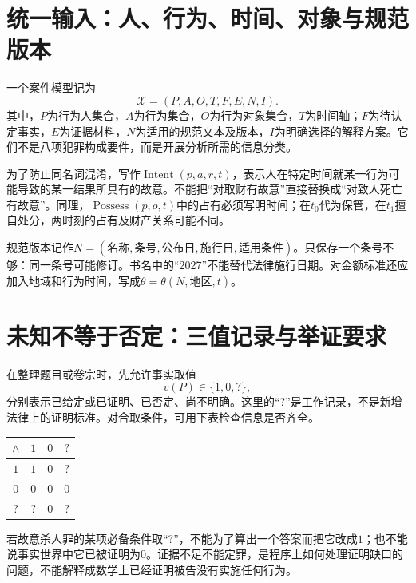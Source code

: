 \section{统一输入：人、行为、时间、对象与规范版本}
\begin{modeldef}[案件输入]
一个案件模型记为
\[
 \mathcal X=(P,A,O,T,F,E,N,I).
\]
其中，$P$为行为人集合，$A$为行为集合，$O$为行为对象集合，$T$为时间轴；$F$为待认定事实，$E$为证据材料，$N$为适用的规范文本及版本，$I$为明确选择的解释方案。它们不是八项犯罪构成要件，而是开展分析所需的信息分类。
\end{modeldef}

为了防止同名词混淆，写作$\operatorname{Intent}(p,a,r,t)$，表示人在特定时间就某一行为可能导致的某一结果所具有的故意。不能把“对取财有故意”直接替换成“对致人死亡有故意”。同理，$\operatorname{Possess}(p,o,t)$中的占有必须写明时间；在$ t_0 $代为保管，在$ t_1 $擅自处分，两时刻的占有及财产关系可能不同。

规范版本记作$N=(\text{名称},\text{条号},\text{公布日},\text{施行日},\text{适用条件})$。只保存一个条号不够：同一条号可能修订。书名中的“2027”不能替代法律施行日期。对金额标准还应加入地域和行为时间，写成$\theta=\theta(N,\text{地区},t)$。

\section{未知不等于否定：三值记录与举证要求}

在整理题目或卷宗时，先允许事实取值
\[
 v(P)\in\{1,0,?\},
\]
分别表示已给定或已证明、已否定、尚不明确。这里的“?”是工作记录，不是新增法律上的证明标准。对合取条件，可用下表检查信息是否齐全。

\begin{center}
\begin{tabular}{c|ccc}
$\wedge$ & $1$ & $0$ & $? $\\\hline
$1$ & $1$ & $0$ & $? $\\
$0$ & $0$ & $0$ & $0$\\
$?$ & $? $ & $0$ & $? $\\
\end{tabular}
\end{center}

若故意杀人罪的某项必备条件取“?”，不能为了算出一个答案而把它改成$1$；也不能说事实世界中它已被证明为$0$。证据不足不能定罪，是程序上如何处理证明缺口的问题，不能解释成数学上已经证明被告没有实施任何行为。

